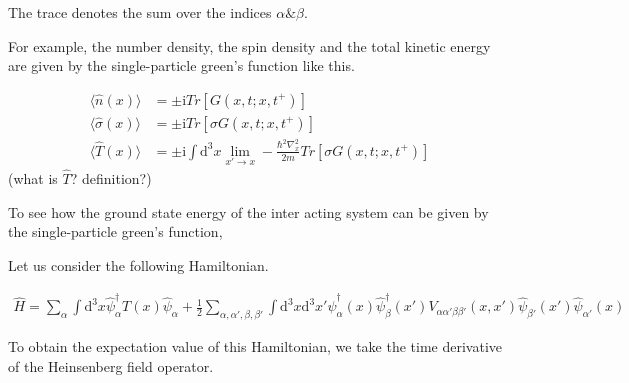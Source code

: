 The trace denotes the sum over the indices $\alpha \& \beta$.

For example, the number density, the spin density and the total kinetic energy are given by the single-particle green's function like this.

\begin{align}
\langle\hat{n}(x)\rangle&=\pm\mathrm{i}Tr[G(x,t;x,t^+)] \nonumber \\
\langle\hat{\sigma}(x)\rangle&=\pm\mathrm{i}Tr[\sigma G(x,t;x,t^+)] \nonumber \\
\langle\hat{T}(x)\rangle&=\pm\mathrm{i}\int \mathrm{d}^3x \lim_{x'\rightarrow x}-\frac{\hbar^2\nabla^2_x}{2m}Tr[\sigma G(x,t;x,t^+)]  \nonumber
\end{align}
(what is $\hat T$? definition?)

To see how the ground  state energy  of the inter acting system can be given by the single-particle green's function,

Let us consider the following Hamiltonian.

\begin{align}\label{2.3.3}
\hat H=\sum_{\alpha}\int \mathrm{d}^3x \hat \psi^{\dagger}_{\alpha}T(x)\hat \psi_{\alpha}+\frac{1}{2}\sum_{\alpha,\alpha',\beta,\beta'}\int \mathrm{d}^3x\mathrm{d}^3x'\hat \psi^{\dagger}_{\alpha}(x)\hat \psi^{\dagger}_{\beta}(x')V_{\alpha\alpha'\beta\beta'}(x,x')\hat \psi_{\beta'}(x')\hat \psi_{\alpha'}(x) 
\end{align}

To obtain the expectation value of this Hamiltonian, we take the time derivative of the Heinsenberg field operator.

